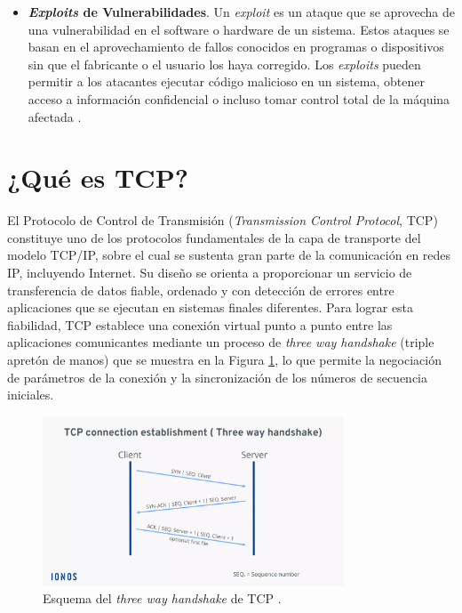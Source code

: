 \begin{itemize}
\item{\textbf{\textit{Exploits} de Vulnerabilidades}}.
Un \textit{exploit} es un ataque que se aprovecha de una vulnerabilidad en el software o hardware de un sistema. Estos ataques se basan en el aprovechamiento de fallos conocidos en programas o dispositivos sin que el fabricante o el usuario los haya corregido. Los \textit{exploits} pueden permitir a los atacantes ejecutar código malicioso en un sistema, obtener acceso a información confidencial o incluso tomar control total de la máquina afectada \cite{cissp2018}.

\end{itemize}

\section{¿Qué es TCP?}

El Protocolo de Control de Transmisión (\textit{Transmission Control Protocol}, TCP) constituye uno de los protocolos fundamentales de la capa de transporte del modelo TCP/IP, sobre el cual se sustenta gran parte de la comunicación en redes IP, incluyendo Internet. Su diseño se orienta a proporcionar un servicio de transferencia de datos fiable, ordenado y con detección de errores entre aplicaciones que se ejecutan en sistemas finales diferentes. Para lograr esta fiabilidad, TCP establece una conexión virtual punto a punto entre las aplicaciones comunicantes mediante un proceso de \textit{three way handshake} (triple apretón de manos) que se muestra en la Figura \ref{fig:EsquemaTCP}, lo que permite la negociación de parámetros de la conexión y la sincronización de los números de secuencia iniciales.

\begin{figure}[htbp]
    \centering
    \includegraphics[width=0.8\textwidth]{./img/ent-problema/EsquemaTCP.png}
    \caption{Esquema del \textit{three way handshake} de TCP \cite{tcpprotocolionos}.}
    \label{fig:EsquemaTCP}
\end{figure}

